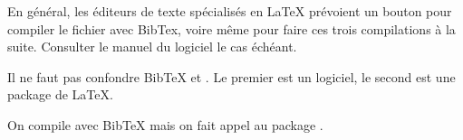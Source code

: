 En général, les éditeurs de texte spécialisés en \LaTeX{} prévoient un bouton pour compiler le fichier  avec BibTex, voire même pour faire ces trois compilations à la suite. Consulter le manuel du logiciel le cas échéant.

\begin{attention}

Il ne faut pas confondre BibTeX et . Le premier est un logiciel, le second est une package de \LaTeX{}.

On compile avec BibTeX mais on fait appel au package .

\end{attention}






